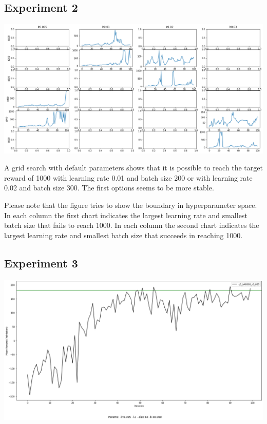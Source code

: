 \documentclass[11pt]{article}
\begin{document}
    \subsection{Experiment 2}

    \hspace*{-0.5in}
    \includegraphics[scale=0.35]{q2/q2_grid_plot}

    A grid search with default parameters shows that it is possible to reach the target reward of 1000 with learning rate 0.01 and batch size 200 or with learning rate 0.02 and batch size 300.
    The first options seems to be more stable.

    Please note that the figure tries to show the boundary in hyperparameter space.
    In each column the first chart indicates the largest learning rate and smallest batch size that fails to reach 1000.
    In each column the second chart indicates the largest learning rate and smallest batch size that succeeds in reaching 1000.

    \subsection{Experiment 3}

    \hspace*{-0.5in}
    \includegraphics[scale=0.35]{q3/q3_b40000_r0.005_mean_rewards}
\end{document}
